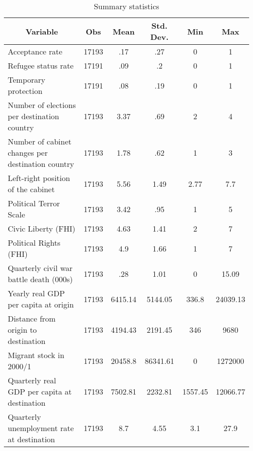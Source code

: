 \begin{table}[htbp]\centering \caption{Summary statistics\label{sumstat}}
\begin{tabular}{l c c c c c }\hline\hline
\multicolumn{1}{c}{Variable} & Obs & Mean & Std. Dev.
 & Min & Max  \\ \hline
Acceptance rate & 17193 & .17 & .27 & 0 & 1  \\
Refugee status rate & 17191 & .09 & .2 & 0 & 1  \\
Temporary protection & 17191 & .08 & .19 & 0 & 1  \\
Number of elections per destination country & 17193 & 3.37 & .69 & 2 & 4  \\
Number of cabinet changes per destination country & 17193 & 1.78 & .62 & 1 & 3  \\
Left-right position of the cabinet & 17193 & 5.56 & 1.49 & 2.77 & 7.7  \\
Political Terror Scale & 17193 & 3.42 & .95 & 1 & 5  \\
Civic Liberty (FHI) & 17193 & 4.63 & 1.41 & 2 & 7  \\
Political Rights (FHI) & 17193 & 4.9 & 1.66 & 1 & 7  \\
Quarterly civil war battle death (000s) & 17193 & .28 & 1.01 & 0 & 15.09  \\
Yearly real GDP per capita at origin & 17193 & 6415.14 & 5144.05 & 336.8 & 24039.13  \\
Distance from origin to destination & 17193 & 4194.43 & 2191.45 & 346 & 9680  \\
Migrant stock in 2000/1 & 17193 & 20458.8 & 86341.61 & 0 & 1272000  \\
Quarterly real GDP per capita at destination & 17193 & 7502.81 & 2232.81 & 1557.45 & 12066.77  \\
Quarterly unemployment rate at destination & 17193 & 8.7 & 4.55 & 3.1 & 27.9  \\
\hline\end{tabular}
\end{table}
